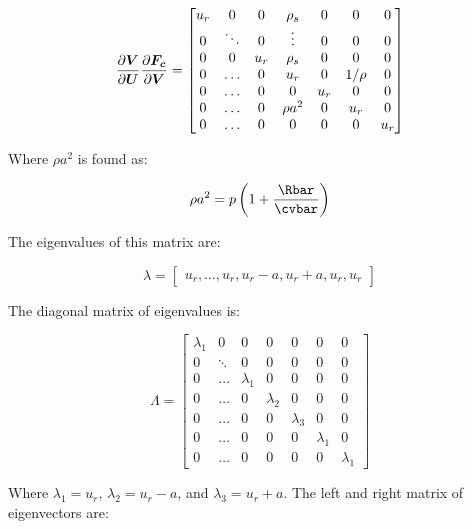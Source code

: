 \documentclass[10pt]{article}
\begin{document}
\begin{flushleft}
\begin{equation*}
    \frac{\partial \boldsymbol{V}}{\partial \boldsymbol{U}} \frac{\partial \boldsymbol{F_c}}{\partial \boldsymbol{V}} = \begin{bmatrix}
        u_r & 0 & 0 & \rho_s & 0 & 0 & 0 \\
        0 & \ddots & 0 & \vdots & 0 & 0 & 0 \\
        0 & 0 & u_r & \rho_s & 0 & 0 & 0 \\
        0 & \dots & 0 & u_r & 0 & 1 / \rho & 0 \\
        0 & \dots & 0 & 0 & u_r & 0 & 0 \\
        0 & \dots & 0 &  \rho a^2 & 0 & u_r & 0 \\
        0 & \dots & 0 & 0 & 0 & 0 & u_r
    \end{bmatrix}
\end{equation*}

Where $\rho a^2$ is found as:

\begin{equation*}
    \rho a^2 = p \bp{1 + \frac{\Rbar}{\cvbar}}
\end{equation*}

The eigenvalues of this matrix are:

\begin{equation*}
    \lambda = \begin{bmatrix}
        u_r, \dots, u_r, u_r - a, u_r + a, u_r, u_r
    \end{bmatrix}
\end{equation*}

The diagonal matrix of eigenvalues is:

\begin{equation*}
    \Lambda = \begin{bmatrix}
        \lambda_1 & 0 & 0 & 0 & 0 & 0 & 0 \\
        0 & \ddots & 0 & 0 & 0 & 0 & 0 \\
        0 & \dots & \lambda_1 & 0 & 0 & 0 & 0 \\
        0 & \dots & 0 & \lambda_2 & 0 & 0 & 0  \\
        0 & \dots & 0 & 0 & \lambda_3 & 0 & 0 \\
        0 & \dots & 0 & 0 & 0 &\lambda_1 & 0 \\
        0 & \dots & 0 & 0 & 0 & 0 & \lambda_1
    \end{bmatrix}
\end{equation*}

Where $\lambda_1 = u_r$, $\lambda_2 = u_r - a$, and $\lambda_3 = u_r + a$. The left and right matrix of eigenvectors are:


\end{flushleft}
\end{document}
